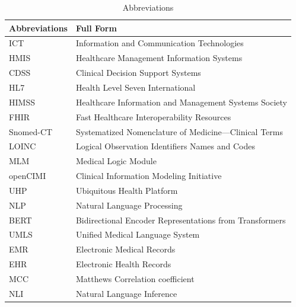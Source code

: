 \documentclass{ieeeaccess}
\begin{document}
\begin{table}[]
	\centering
	\caption{Abbreviations}
	\label{tab:abbreviations}
	\begin{tabular}{ll}
		\hline
		Abbreviations              & Full Form                                               \\ \hline
		ICT                        & Information and Communication Technologies              \\
		HMIS                       & Healthcare Management Information Systems               \\
		CDSS                       & Clinical Decision Support Systems                       \\
		HL7                        & Health Level Seven International                        \\
		HIMSS                      & Healthcare Information and Management Systems Society   \\
		FHIR                       & Fast Healthcare Interoperability Resources              \\
		Snomed-CT                  & Systematized Nomenclature of Medicine—Clinical Terms    \\
		LOINC                      & Logical Observation Identifiers Names and Codes         \\
		MLM                        & Medical Logic Module                                    \\
		openCIMI                       & Clinical Information Modeling Initiative                \\
		UHP                        & Ubiquitous Health Platform                              \\
		NLP                        & Natural Language Processing                             \\
		BERT                       & Bidirectional Encoder Representations from Transformers \\
		UMLS                       & Unified Medical Language System                         \\
		EMR 					   & Electronic Medical Records                              \\
		EHR						   & Electronic Health Records                               \\
		MCC                        & Matthews Correlation coefficient                        \\
		NLI                        & Natural Language Inference                              \\ \hline
	\end{tabular}
\end{table}
\end{document}
